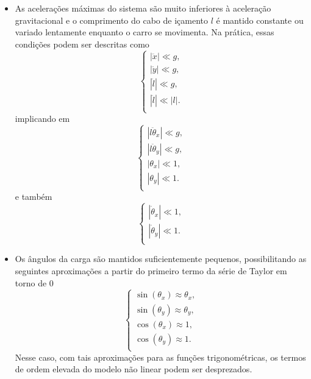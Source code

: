 \documentclass{ppgeesa}
\begin{document}
\begin{itemize}
  \item As acelerações máximas do sistema são muito inferiores à aceleração gravitacional e o comprimento do cabo de içamento $l$ é mantido constante ou variado lentamente enquanto o carro se movimenta. Na prática, essas condições podem ser descritas como\\
    \begin{equation}
      \begin{cases}
        |\ddot{x}| \ll g,\\
        |\ddot{y}| \ll g,\\
        |\ddot{l}| \ll g,\\
        |\ddot{l}| \ll |l|.\\
      \end{cases}
    \end{equation}
  implicando em\\
    \begin{equation}
      \begin{cases}
        |l\ddot{\theta}_x| \ll g,\\
        |l\ddot{\theta}_y| \ll g,\\
        |\theta_x| \ll 1,\\
        |\theta_y| \ll 1.\\
      \end{cases}
    \end{equation}
  e também
    \begin{equation}
      \begin{cases}
        |\dot{\theta}_x| \ll 1,\\
        |\dot{\theta}_y| \ll 1.\\
      \end{cases}
    \end{equation}
  \item Os ângulos da carga são mantidos suficientemente pequenos, possibilitando as seguintes aproximações a partir do primeiro termo da série de Taylor em torno de $0$
    \begin{equation}
      \begin{cases}
        \sin(\theta_x) \approx \theta_x,\\
        \sin(\theta_y) \approx \theta_y,\\
        \cos(\theta_x) \approx 1,\\
        \cos(\theta_y) \approx 1.\\
      \end{cases}
    \end{equation}
  Nesse caso, com tais aproximações para as funções trigonométricas, os termos de ordem elevada do modelo não linear podem ser desprezados.
\end{itemize}
\end{document}
